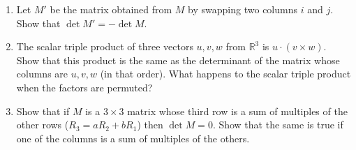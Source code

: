 \begin{enumerate}
%
%
%
%
%
%

\item Let $M'$ be the matrix obtained from $M$ by swapping two columns $i$ and $j$. Show that $\det M'=-\det M $.

\item The scalar triple product of three vectors $u,v,w$ from $\mathbb{R}^3$ is $u\cdot(v\times w)$. Show that this product is the same as the determinant of the matrix whose columns are $u,v,w$ (in that order). What happens to the scalar triple product when the factors are permuted? 

\item Show that if $M$ is a $3\times 3$ matrix whose third row is a sum of multiples of the other rows ($R_3=aR_2+bR_1$) then $\det M=0$. Show that the same is true if one of the columns is a sum of multiples of the others. 

\end{enumerate}

